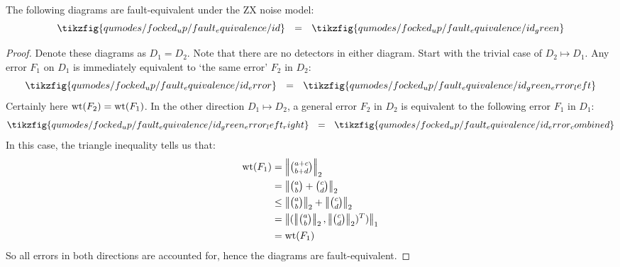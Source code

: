 \begin{proposition}\label{prop:id_rule_fault_equiv}
    The following diagrams are fault-equivalent under the ZX noise model:
    \begin{equation}
        \tikzfig{qumodes/focked_up/fault_equivalence/id}
        ~~=~~
        \tikzfig{qumodes/focked_up/fault_equivalence/id_green}
    \end{equation}
    \begin{proof}
        Denote these diagrams as $D_1 = D_2$.
        Note that there are no detectors in either diagram.
        Start with the trivial case of $D_2 \mapsto D_1$.
        Any error $F_1$ on $D_1$ is immediately equivalent to `the same error' $F_2$ in $D_2$:
        \begin{equation}
            \tikzfig{qumodes/focked_up/fault_equivalence/id_error}
            ~~=~~
            \tikzfig{qumodes/focked_up/fault_equivalence/id_green_error_left}
        \end{equation}
        Certainly here $\operatorname{wt}(F_2) = \operatorname{wt}(F_1)$.
        In the other direction $D_1 \mapsto D_2$, a general error $F_2$ in $D_2$ is equivalent to the following error $F_1$ in $D_1$:
        \begin{equation}
            \tikzfig{qumodes/focked_up/fault_equivalence/id_green_error_left_right}
            ~~=~~
            \tikzfig{qumodes/focked_up/fault_equivalence/id_error_combined}
        \end{equation}
        In this case, the triangle inequality tells us that:
        \begin{equation}
            \begin{aligned}
                \wt(F_1)
                &= \twonorm{\tbinom{a + c}{b + d}} \\
                &= \twonorm{\tbinom{a}{b} + \tbinom{c}{d}} \\
                &\leq \twonorm{\tbinom{a}{b}} + \twonorm{\tbinom{c}{d}} \\
                &= \onenorm{(\twonorm{\tbinom{a}{b}}, \twonorm{\tbinom{c}{d}})^T)} \\
                &= \wt(F_1)
            \end{aligned}
        \end{equation}
        So all errors in both directions are accounted for, hence the diagrams are fault-equivalent.
    \end{proof}
\end{proposition}

